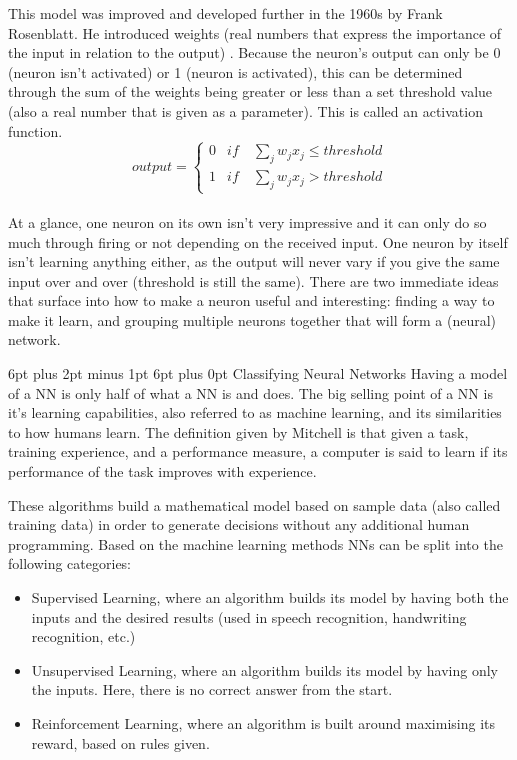 \documentclass[12pt,a4paper]{article}
\makeatletter
\renewcommand\subsection{\@startsection {subsection}{1}{2mm} %
                               {6pt plus 2pt minus 1pt} %
                               {6pt plus 0pt} %
                               {\normalfont\bfseries}}
\makeatother
\begin{document}
This model was improved and developed further in the 1960s by Frank Rosenblatt. He introduced weights (real numbers that express the importance of the input in relation to the output) \cite{rosenblatt_perceptron:_1958}. Because the neuron’s output can only be 0 (neuron isn’t activated) or 1 (neuron is activated), this can be determined through the sum of the weights being greater or less than a set threshold value (also a real number that is given as a parameter). This is called an activation function.
\begin{equation}
 output =
    \begin{cases}
      0 & if \quad \sum_{j}^{} w_j x_j \leq threshold\\
      1 & if \quad \sum_{j}^{} w_j x_j > threshold
    \end{cases}
\label{eq:1}
\end{equation}
\\
At a glance, one neuron on its own isn’t very impressive and it can only do so much through firing or not depending on the received input. One neuron by itself isn’t learning anything either, as the output will never vary if you give the same input over and over (threshold is still the same). There are two immediate ideas that surface into how to make a neuron useful and interesting: finding a way to make it learn, and grouping multiple neurons together that will form a (neural) network. \cite{marsland_machine_2015}

\subsection{Classifying Neural Networks}
Having a model of a NN is only half of what a NN is and does. The big selling point of a NN is it’s learning capabilities, also referred to as machine learning, and its similarities to how humans learn. The definition given by Mitchell \cite{mitchell_explanation-based_1993} is that given a task, training experience, and a performance measure, a computer is said to learn if its performance of the task improves with experience.\cite{thrun_learning_2012}\par
These algorithms build a mathematical model based on sample data (also called training data) in order to generate decisions without any additional human programming. Based on the machine learning methods NNs can be split into the following categories:
\begin{itemize}
	\item Supervised Learning, where an algorithm builds its model by having both the inputs and the desired results (used in speech recognition, handwriting recognition, etc.)
	\item Unsupervised Learning, where an algorithm builds its model by having only the inputs. Here, there is no correct answer from the start.
	\item Reinforcement Learning, where an algorithm is built around maximising its reward, based on rules given.
\end{itemize}
\end{document}
